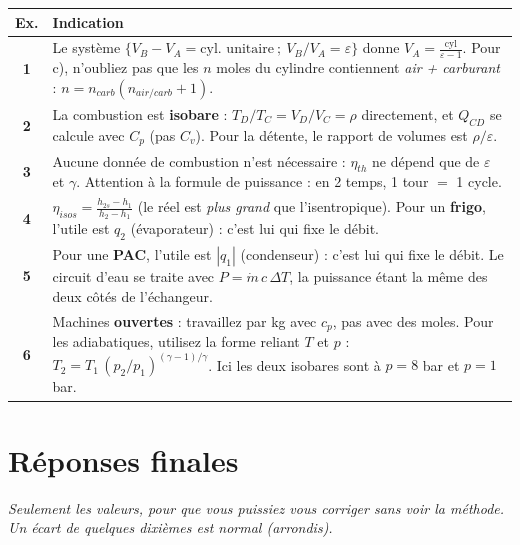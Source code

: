 \documentclass[11pt,a4paper]{article}
\begin{document}
\begin{center}
\renewcommand{\arraystretch}{1.5}
\begin{tabularx}{\linewidth}{@{}c X@{}}
\toprule
\textbf{Ex.} & \textbf{Indication} \\
\midrule
\textbf{1} & Le système $\{V_B-V_A=\text{cyl. unitaire}\ ;\ V_B/V_A=\varepsilon\}$ donne
$V_A=\frac{\text{cyl}}{\varepsilon-1}$. Pour c), n'oubliez pas que les $n$ moles du cylindre contiennent
\emph{air + carburant} : $n=n_{carb}(n_{air/carb}+1)$. \\
\textbf{2} & La combustion est \textbf{isobare} : $T_D/T_C=V_D/V_C=\rho$ directement, et $Q_{CD}$ se
calcule avec $C_p$ (pas $C_v$). Pour la détente, le rapport de volumes est $\rho/\varepsilon$. \\
\textbf{3} & Aucune donnée de combustion n'est nécessaire : $\eta_{th}$ ne dépend que de $\varepsilon$ et
$\gamma$. Attention à la formule de puissance : en 2 temps, 1 tour $=$ 1 cycle. \\
\textbf{4} & $\eta_{isos}=\frac{h_{2s}-h_1}{h_2-h_1}$ (le réel est \emph{plus grand} que l'isentropique).
Pour un \textbf{frigo}, l'utile est $q_2$ (évaporateur) : c'est lui qui fixe le débit. \\
\textbf{5} & Pour une \textbf{PAC}, l'utile est $|q_1|$ (condenseur) : c'est lui qui fixe le débit. Le
circuit d'eau se traite avec $P=\dot m\,c\,\Delta T$, la puissance étant la même des deux côtés de
l'échangeur. \\
\textbf{6} & Machines \textbf{ouvertes} : travaillez par kg avec $c_p$, pas avec des moles. Pour les
adiabatiques, utilisez la forme reliant $T$ et $p$ : $T_2=T_1\,(p_2/p_1)^{(\gamma-1)/\gamma}$. Ici les
deux isobares sont à $p=8$ bar et $p=1$ bar. \\
\bottomrule
\end{tabularx}
\end{center}

\newpage
\section{Réponses finales}
\emph{Seulement les valeurs, pour que vous puissiez vous corriger sans voir la méthode. Un écart de
quelques dixièmes est normal (arrondis).}
\end{document}
